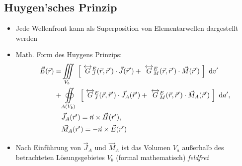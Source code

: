 {\subsection{Huygen'sches Prinzip}
\begin{itemize}
    \itemsep0pt
    \item Jede Wellenfront kann als Superposition von Elementarwellen dargestellt werden
    \item Math. Form des Huygens Prinzips:
        \begin{align*}
            \vec{E}(\vec{r}) = &\iiint\limits_{V_b}\
            \left[\
            \overleftrightarrow{G}^E_J(\vec{r},\vec{r}^\prime)\cdot\vec{J}(\vec{r}^\prime) +\
            \overleftrightarrow{G}^E_M(\vec{r},\vec{r}^\prime)\cdot\vec{M}(\vec{r}^\prime)\
            \right]\
            \mathrm{d}v^\prime\\
            + &\oiint\limits_{A(V_b)}\
            \left[\
            \overleftrightarrow{G}^E_J(\vec{r},\vec{r}^\prime)\cdot\vec{J}_A(\vec{r}^\prime) +\
            \overleftrightarrow{G}^E_M(\vec{r},\vec{r}^\prime)\cdot\vec{M}_A(\vec{r}^\prime)\
            \right]\
            \mathrm{d}a^\prime,\\
            &\vec{J}_A(\vec{r}^\prime) = \vec{n} \times \vec{H}(\vec{r}^\prime),\\
            &\vec{M}_A(\vec{r}^\prime) = -\vec{n} \times \vec{E}(\vec{r}^\prime)\\
        \end{align*}
    \item Nach Einführung von $\vec{J}_A$ und $\vec{M}_A$ ist das Volumen $V_a$ außerhalb des betrachteten Lösungsgebietes $V_b$ (formal mathematisch) \textit{feldfrei}
\end{itemize}
}
